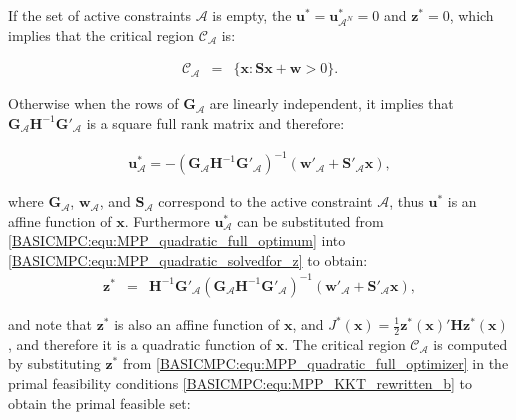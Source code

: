     If the set of active constraints $\mathcal{A}$ is empty, the $\textbf{u}^*=\textbf{u}^*_{\mathcal{A}^N}=0$ and $\textbf{z}^*=0$, which implies that the critical region $\mathcal{C}_{\mathcal{A}}$ is:
    
   \begin{equation}
    \begin{array}{rcl}
            \mathcal{C}_{\mathcal{A}}&=&\{\textbf{x}:\textbf{Sx}+\textbf{w} > 0 \}.
        \end{array}
        \label{BASICMPC:equ:MPP_quadratic_emptycritical}
    \end{equation}
    
    Otherwise when the rows of $\textbf{G}_{\mathcal{A}}$ are linearly independent, it implies that $\textbf{G}_{\mathcal{A}}\textbf{H}^{-1}\textbf{G}'_{\mathcal{A}}$ is a square full rank matrix and therefore:
    
    \begin{equation}
    \begin{array}{rcl}
            \textbf{u}^*_{\mathcal{A}}=-(\textbf{G}_{\mathcal{A}}\textbf{H}^{-1}\textbf{G}'_{\mathcal{A}})^{-1}(\textbf{w}'_{\mathcal{A}}+\textbf{S}'_{\mathcal{A}}\textbf{x}),
        \end{array}
        \label{BASICMPC:equ:MPP_quadratic_full_optimum}
    \end{equation}
    
    where $\textbf{G}_{\mathcal{A}}$, $\textbf{w}_{\mathcal{A}}$, and $\textbf{S}_{\mathcal{A}}$ correspond to the active constraint $\mathcal{A}$, thus $\textbf{u}^*$ is an affine function of $\textbf{x}$. Furthermore $\textbf{u}^*_{\mathcal{A}}$ can be substituted from \ref{BASICMPC:equ:MPP_quadratic_full_optimum} into \ref{BASICMPC:equ:MPP_quadratic_solvedfor_z} to obtain:
    \begin{equation}
    \begin{array}{rcl}
            \textbf{z}^*&=&\textbf{H}^{-1}\textbf{G}'_{\mathcal{A}}(\textbf{G}_{\mathcal{A}}\textbf{H}^{-1}\textbf{G}'_{\mathcal{A}})^{-1}(\textbf{w}'_{\mathcal{A}}+\textbf{S}'_{\mathcal{A}}\textbf{x}),
        \end{array}
        \label{BASICMPC:equ:MPP_quadratic_full_optimizer}
    \end{equation}
    
    and note that $\textbf{z}^*$ is also an affine function of $\textbf{x}$, and $J^*(\textbf{x})=\frac{1}{2}\textbf{z}^*(\textbf{x})'\textbf{H}\textbf{z}^*(\textbf{x})$, and therefore it is a quadratic function of $\textbf{x}$. The critical region $\mathcal{C}_{\mathcal{A}}$ is computed by substituting $\textbf{z}^*$ from \ref{BASICMPC:equ:MPP_quadratic_full_optimizer} in the primal feasibility conditions \ref{BASICMPC:equ:MPP_KKT_rewritten_b} to obtain the primal feasible set:
    
